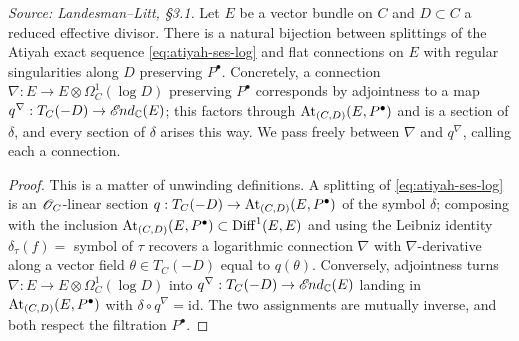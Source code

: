 \begin{proposition}
  \label{prop:atiyah-splittings}
  \textit{Source: Landesman--Litt, \S3.1.}
  Let $E$ be a vector bundle on $C$ and $D \subset C$ a reduced effective divisor.
  There is a natural bijection between splittings of the Atiyah exact sequence
  \eqref{eq:atiyah-ses-log} and flat connections on $E$ with regular
  singularities along $D$ preserving $P^\bullet$. Concretely, a connection
  $\nabla: E \to E \otimes \Omega^1_C(\log D)$ preserving $P^\bullet$ corresponds
  by adjointness to a map $q^\nabla: T_C(-D) \to \mathscr{E}\kern -1pt nd_{\mathbb{C}}(E)$; this factors
  through $\operatorname{At}_{(C,D)}(E,P^\bullet)$ and is a section of $\delta$, and every
  section of $\delta$ arises this way. We pass freely between $\nabla$ and
  $q^\nabla$, calling each a connection.
\end{proposition}
\begin{proof}
  This is a matter of unwinding definitions. A splitting of
  \eqref{eq:atiyah-ses-log} is an $\mathscr{O}_C$-linear section
  $q: T_C(-D) \to \operatorname{At}_{(C,D)}(E,P^\bullet)$ of the symbol $\delta$; composing
  with the inclusion $\operatorname{At}_{(C,D)}(E,P^\bullet) \subset \operatorname{Diff}^1(E,E)$ and
  using the Leibniz identity $\delta_\tau(f) = $ symbol of $\tau$ recovers a
  logarithmic connection $\nabla$ with $\nabla$-derivative along a vector field
  $\theta \in T_C(-D)$ equal to $q(\theta)$. Conversely, adjointness turns
  $\nabla: E \to E \otimes \Omega^1_C(\log D)$ into
  $q^\nabla: T_C(-D) \to \mathscr{E}\kern -1pt nd_{\mathbb{C}}(E)$ landing in
  $\operatorname{At}_{(C,D)}(E,P^\bullet)$ with $\delta \circ q^\nabla = \mathrm{id}$.
  The two assignments are mutually inverse, and both respect the filtration
  $P^\bullet$.
\end{proof}

